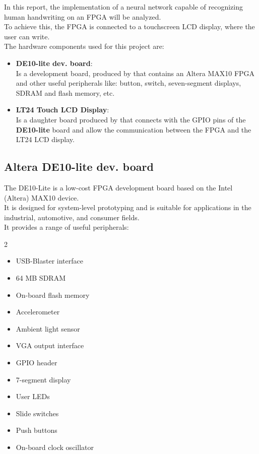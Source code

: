 
In this report, the implementation of a neural network capable of recognizing human handwriting on an FPGA will be analyzed. \\
To achieve this, the FPGA is connected to a touchscreen LCD display, where the user can write. \\
The hardware components used for this project are:

\begin{itemize}
    \item \textbf{DE10-lite dev. board}:\\
    Is a development board, produced by \terasic that contains an Altera MAX10 FPGA and other useful peripherals like: button, switch, seven-segment displays, SDRAM and flash memory, etc.
    \item \textbf{LT24 Touch LCD Display}:\\
    Is a daughter board produced by \terasic that connects with the GPIO pins of the \textbf{DE10-lite} board and allow the communication between the FPGA and the LT24 LCD display.
\end{itemize}

\subsection{Altera DE10-lite dev. board}

The DE10-Lite is a low-cost FPGA development board based on the Intel (Altera) MAX10 device. \\
It is designed for system-level prototyping and is suitable for applications in the industrial, automotive, and consumer fields. \\
It provides a range of useful peripherals:

\begin{multicols}{2}
    \begin{itemize}
        \setlength\itemsep{0pt}
        \setlength\parskip{0pt}
        \item USB-Blaster interface
        \item 64 MB SDRAM
        \item On-board flash memory
        \item Accelerometer
        \item Ambient light sensor
        \item VGA output interface
        \item GPIO header
        \item 7-segment display
        \item User LEDs
        \item Slide switches
        \item Push buttons
        \item On-board clock oscillator
    \end{itemize}
\end{multicols}

